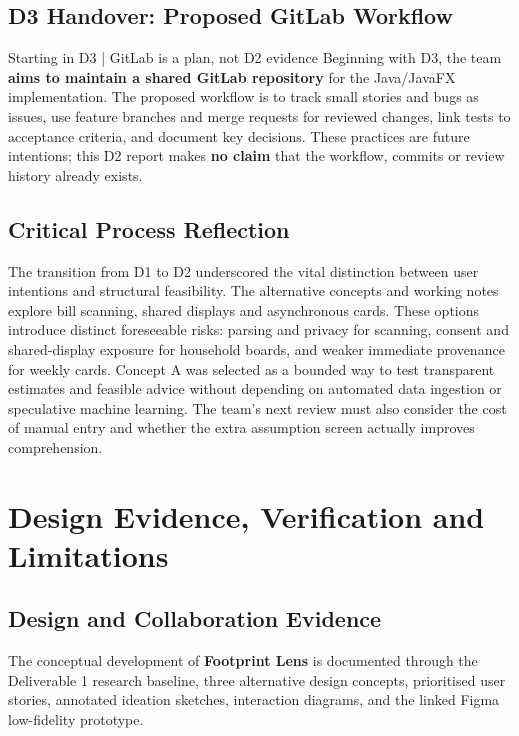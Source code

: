 \documentclass[12pt,a4paper]{article}
\begin{document}
\subsection{D3 Handover: Proposed GitLab Workflow}
\begin{insightbox}{Starting in D3 | GitLab is a plan, not D2 evidence}
Beginning with D3, the team \textbf{aims to maintain a shared GitLab repository} for the Java/JavaFX implementation. The proposed workflow is to track small stories and bugs as issues, use feature branches and merge requests for reviewed changes, link tests to acceptance criteria, and document key decisions. These practices are future intentions; this D2 report makes \textbf{no claim} that the workflow, commits or review history already exists.
\end{insightbox}

\subsection{Critical Process Reflection}
The transition from D1 to D2 underscored the vital distinction between user intentions and structural feasibility. The alternative concepts and working notes explore bill scanning, shared displays and asynchronous cards. These options introduce distinct foreseeable risks: parsing and privacy for scanning, consent and shared-display exposure for household boards, and weaker immediate provenance for weekly cards. Concept A was selected as a bounded way to test transparent estimates and feasible advice without depending on automated data ingestion or speculative machine learning. The team's next review must also consider the cost of manual entry and whether the extra assumption screen actually improves comprehension.


\section{Design Evidence, Verification and Limitations}
\label{sec:design-evidence}

\subsection{Design and Collaboration Evidence}

The conceptual development of \textbf{Footprint Lens} is documented through the Deliverable 1 research baseline, three alternative design concepts, prioritised user stories, annotated ideation sketches, interaction diagrams, and the linked Figma low-fidelity prototype.
\end{document}
